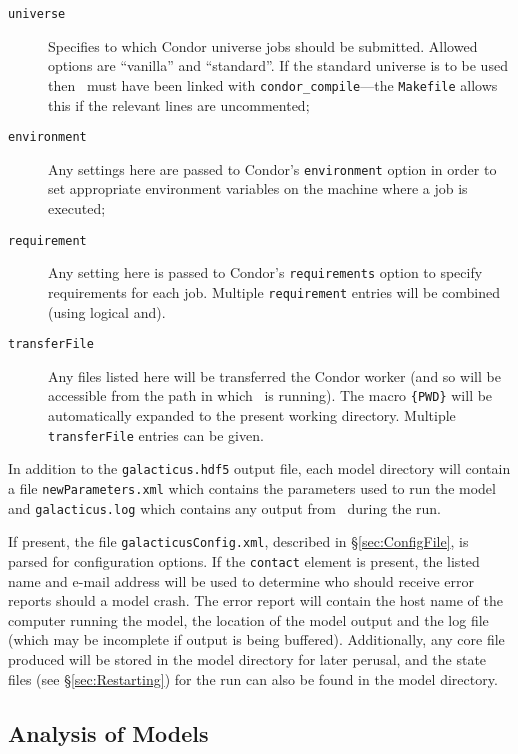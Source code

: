 \begin{description}
\begin{description}
\item[{\tt universe}] Specifies to which {\sc Condor} universe jobs should be submitted. Allowed options are ``vanilla'' and ``standard''. If the standard universe is to be used then \glc\ must have been linked with {\tt condor\_compile}---the {\tt Makefile} allows this if the relevant lines are uncommented;
\item[{\tt environment}] Any settings here are passed to {\sc Condor}'s {\tt environment} option in order to set appropriate environment variables on the machine where a job is executed;
\item[{\tt requirement}] Any setting here is passed to {\sc Condor}'s {\tt requirements} option to specify requirements for each job. Multiple {\tt requirement} entries will be combined (using logical and).
\item[{\tt transferFile}] Any files listed here will be transferred the Condor worker (and so will be accessible from the path in which \glc\ is running). The macro {\tt \{PWD\}} will be automatically expanded to the present working directory. Multiple {\tt transferFile} entries can be given.
\end{description}
\end{description}

In addition to the {\tt galacticus.hdf5} output file, each model directory will contain a file {\tt newParameters.xml} which contains the parameters used to run the model and {\tt galacticus.log} which contains any output from \glc\ during the run.

If present, the file {\tt galacticusConfig.xml}, described in \S\ref{sec:ConfigFile}, is parsed for configuration options. If the {\tt contact} element is present, the listed name and e-mail address will be used to determine who should receive error reports should a model crash. The error report will contain the host name of the computer running the model, the location of the model output and the log file (which may be incomplete if output is being buffered). Additionally, any core file produced will be stored in the model directory for later perusal, and the state files (see \S\ref{sec:Restarting}) for the run can also be found in the model directory.

\subsection{Analysis of Models}\label{sec:AnalysisScripts}


